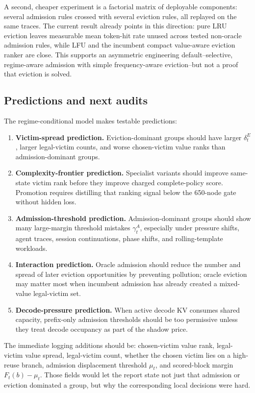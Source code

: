 \documentclass[11pt]{article}
\begin{document}
A second, cheaper experiment is a factorial matrix of deployable components: several
admission rules crossed with several eviction rules, all replayed on the same traces.
The current result already points in this direction: pure LRU eviction leaves measurable
mean token-hit rate unused across tested non-oracle admission rules, while LFU and the
incumbent compact value-aware eviction ranker are close.  This supports an asymmetric
engineering default--selective, regime-aware admission with simple frequency-aware
eviction--but not a proof that eviction is solved.

\subsection{Predictions and next audits}

The regime-conditional model makes testable predictions:

\begin{enumerate}
  \item \textbf{Victim-spread prediction.}  Eviction-dominant groups should have larger
  \(\delta^E_t\), larger legal-victim counts, and worse chosen-victim value ranks than
  admission-dominant groups.
  \item \textbf{Complexity-frontier prediction.}  Specialist variants should improve
  same-state victim rank before they improve charged complete-policy score.  Promotion
  requires distilling that ranking signal below the 650-node gate without hidden loss.
  \item \textbf{Admission-threshold prediction.}  Admission-dominant groups should show
  many large-margin threshold mistakes \(\gamma^A_t\), especially under pressure shifts,
  agent traces, session continuations, phase shifts, and rolling-template workloads.
  \item \textbf{Interaction prediction.}  Oracle admission should reduce the number and
  spread of later eviction opportunities by preventing pollution; oracle eviction may
  matter most when incumbent admission has already created a mixed-value legal-victim
  set.
  \item \textbf{Decode-pressure prediction.}  When active decode KV consumes shared
  capacity, prefix-only admission thresholds should be too permissive unless they treat
  decode occupancy as part of the shadow price.
\end{enumerate}

The immediate logging additions should be: chosen-victim value rank, legal-victim value
spread, legal-victim count, whether the chosen victim lies on a high-reuse branch,
admission displacement threshold \(\mu_t\), and scored-block margin \(F_t(b)-\mu_t\).
Those fields would let the report state not just that admission or eviction dominated a
group, but why the corresponding local decisions were hard.
\end{document}
